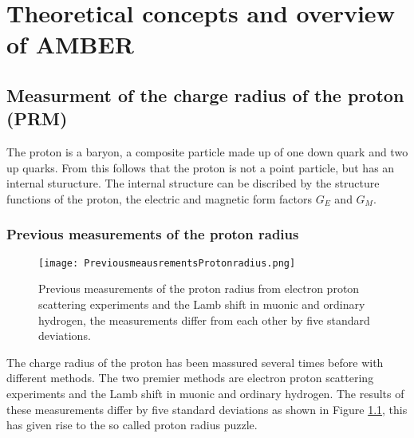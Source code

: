 \chapter{Theoretical concepts and overview of AMBER}\label{cha:theory}
%

\section{Measurment of the charge radius of the proton (PRM)}\label{sec:proton_radius}
The proton is a baryon, a composite particle made up of one down quark and  two up quarks.
From this follows that the proton is not a point particle, but has an internal sturucture.\autocite{Workman:2836514}
\newline
The internal structure can be discribed by the structure functions of the proton, 
the electric and magnetic form factors $G_E$ and $G_M$.\autocite{ProposalAmber}	
\subsection{Previous measurements of the proton radius}
\begin{figure}[h]
	\centering
	\texttt{[image: PreviousmeausrementsProtonradius.png]}
	\caption{Previous measurements of the proton radius from electron proton  scattering experiments and the Lamb shift in muonic and ordinary hydrogen,
	 the measurements differ from each other by five standard deviations.\autocite{ProposalAmber} }
	\label{fig:previous_proton_radius}
\end{figure}

The charge radius of the proton has been massured several times before with different methods.
The two premier methods are electron proton scattering experiments and the Lamb shift in muonic and ordinary hydrogen.
The results of these measurements differ by five standard deviations as shown in Figure \ref{fig:previous_proton_radius},
this has given rise to the so called proton radius puzzle.\autocite{ProposalAmber}


